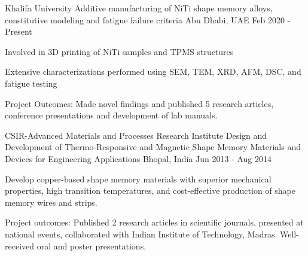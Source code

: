 

\begin{cventries}

  \cventry
    {Khalifa University} %
    {Additive manufacturing of NiTi shape memory alloys, constitutive modeling and fatigue failure criteria} %
    {Abu Dhabi, UAE} %
    {Feb 2020 - Present} %
    {
      \begin{cvitems} %
        \item {Involved in 3D printing of NiTi samples and TPMS structures}
        \item {Extensive characterizations performed using SEM, TEM, XRD, AFM, DSC, and fatigue testing}
        \item {Project Outcomes: Made novel findings and published 5 research articles, conference presentations and development of lab manuals.}
      \end{cvitems}
    }


  \cventry
    {CSIR-Advanced Materials and Processes Research Institute} %
    {Design and Development of Thermo-Responsive and Magnetic Shape Memory Materials and Devices for Engineering Applications} %
    {Bhopal, India} %
    {Jun 2013 - Aug 2014} %
    {
      \begin{cvitems} %
        \item {Develop copper-based shape memory materials with superior mechanical properties, high transition temperatures, and cost-effective production of shape memory wires and strips.}
        \item {Project outcomes: Published 2 research articles in scientific journals, presented at national events, collaborated with Indian Institute of Technology, Madras. Well-received oral and poster presentations.}
      \end{cvitems}
    }

\end{cventries}

